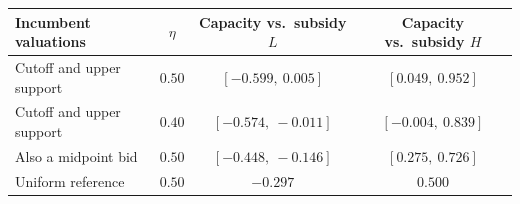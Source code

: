 \begin{tabular*}{\linewidth}{@{\extracolsep{\fill}}lccc@{}}\toprule
Incumbent valuations & $\eta$ & Capacity vs.\ subsidy $L$ & Capacity vs.\ subsidy $H$\\
\midrule
Cutoff and upper support & $0.50$ & $[-0.599,\ 0.005]$ & $[0.049,\ 0.952]$\\
Cutoff and upper support & $0.40$ & $[-0.574,\ -0.011]$ & $[-0.004,\ 0.839]$\\
Also a midpoint bid & $0.50$ & $[-0.448,\ -0.146]$ & $[0.275,\ 0.726]$\\
Uniform reference & $0.50$ & $-0.297$ & $0.500$\\
\bottomrule
\end{tabular*}

